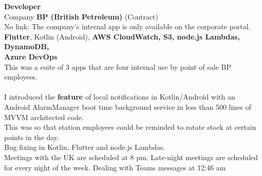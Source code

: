 \documentclass{article}
\begin{document}
%


%
%
%
%
%
%

\textbf{ Developer }\\
Company  \textbf {BP (British Petroleum)}  (Contract) \\
No link: The company's internal app is only available on the corporate portal. \\

\textbf{Flutter}, Kotlin (Android), \textbf{AWS CloudWatch, S3, node.js Lambdas,  DynamoDB, \\ 
Azure DevOps}  \\

This was a suite of 3 apps that are four internal use by point of sale BP employees. \\
\\
I introduced the {\bf feature} of local notifications in Kotlin/Android with an Android AlarmManager boot time background service in less than 500 lines of MVVM architected code. \\
This was so that station employees could be reminded to rotate stock at certain points in the day. \\
 Bug fixing in Kotlin, Flutter and node.js Lambdas. \\
 Meetings with the UK are scheduled at 8 pm. Late-night meetings are scheduled for every night of the week. Dealing with Teams messages at 12:46 am \\
\\
\end{document}
